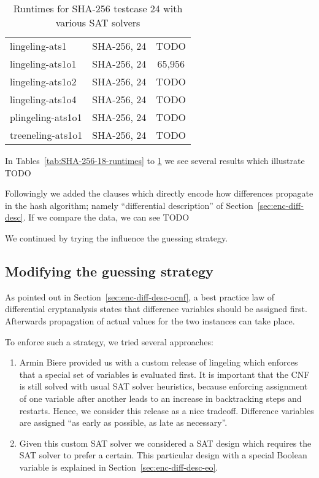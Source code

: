 \begin{table}[!h]
\begin{center}
\begin{tabular}{lcc}
      lingeling-ats1            & SHA-256, 24   & TODO \\
      lingeling-ats1o1          & SHA-256, 24   & 65,956 \\
      lingeling-ats1o2          & SHA-256, 24   & TODO \\
      lingeling-ats1o4          & SHA-256, 24   & TODO \\
      plingeling-ats1o1         & SHA-256, 24   & TODO \\
      treeneling-ats1o1         & SHA-256, 24   & TODO
    \end{tabular}
    \caption{Runtimes for SHA-256 testcase 24 with various SAT solvers}
    \label{tab:SHA-256-24-runtimes}
  \end{center}
\end{table}

In Tables~\ref{tab:SHA-256-18-runtimes} to \ref{tab:SHA-256-24-runtimes}
we see several results which illustrate TODO


Followingly we added the clauses which directly encode how differences
propagate in the hash algorithm; namely \enquote{differential description}
of Section~\ref{sec:enc-diff-desc}. If we compare the data, we can see
TODO

We continued by trying the influence the guessing strategy.

\subsection{Modifying the guessing strategy}
\label{sec:results-guessing}
%
As pointed out in Section~\ref{sec:enc-diff-desc-ocnf}, a best practice law of
differential cryptanalysis states that difference variables should be
assigned first. Afterwards propagation of actual values for the two
instances can take place.

To enforce such a strategy, we tried several approaches:
\begin{enumerate}
  \item
    Armin Biere provided us with a custom release of lingeling
    which enforces that a special set of variables is evaluated
    first. It is important that the CNF is still solved
    with usual SAT solver heuristics, because enforcing
    assignment of one variable after another leads to an increase
    in backtracking steps and restarts. Hence, we consider this
    release as a nice tradeoff. Difference variables are assigned
    \enquote{as early as possible, as late as necessary}.
  \item
    Given this custom SAT solver we considered a SAT design which
    requires the SAT solver to prefer a certain. This particular
    design with a special Boolean variable is explained in
    Section~\ref{sec:enc-diff-desc-eo}.
\end{enumerate}

